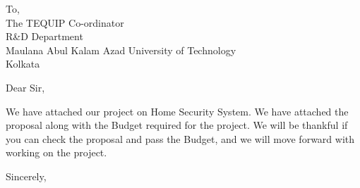 \documentclass[
	pagenumber=false, %
	parskip=half, %
	fromalign=right, %
	foldmarks=true, %
	addrfield=true %
	]{scrlttr2}
\date{\today} %
\begin{document}
 
\begin{letter}{To,\\The TEQUIP Co-ordinator \\ R\&D Department \\ Maulana Abul Kalam Azad University of Technology \\ Kolkata} %



\opening{Dear Sir,}

We have attached our project on Home Security System. We have attached the proposal along with the Budget required for the project. We will be thankful if you can check the proposal and pass the Budget, and we will move forward with working on the project.

\closing{Sincerely,}



\end{letter}
 
\end{document}
